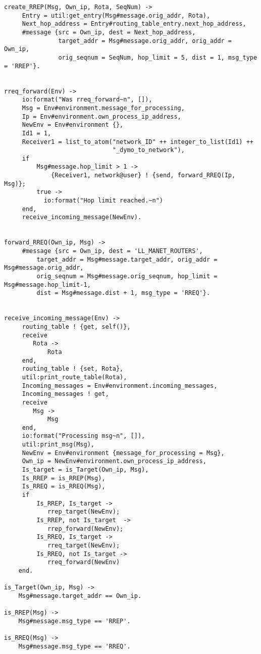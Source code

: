 \begin{verbatim}
create_RREP(Msg, Own_ip, Rota, SeqNum) ->
     Entry = util:get_entry(Msg#message.orig_addr, Rota),
     Next_hop_address = Entry#routing_table_entry.next_hop_address,
     #message {src = Own_ip, dest = Next_hop_address, 
               target_addr = Msg#message.orig_addr, orig_addr = Own_ip, 
               orig_seqnum = SeqNum, hop_limit = 5, dist = 1, msg_type = 'RREP'}.


rreq_forward(Env) -> 
     io:format("Was rreq_forward~n", []), 
     Msg = Env#environment.message_for_processing,
     Ip = Env#environment.own_process_ip_address,
     NewEnv = Env#environment {},
     Id1 = 1,
     Receiver1 = list_to_atom("network_ID" ++ integer_to_list(Id1) ++ 
                              "_dymo_to_network"),
     if
         Msg#message.hop_limit > 1 ->
             {Receiver1, network@user} ! {send, forward_RREQ(Ip, Msg)};
         true ->
           io:format("Hop limit reached.~n")
     end,
     receive_incoming_message(NewEnv).


forward_RREQ(Own_ip, Msg) ->
     #message {src = Own_ip, dest = 'LL_MANET_ROUTERS', 
         target_addr = Msg#message.target_addr, orig_addr = Msg#message.orig_addr, 
         orig_seqnum = Msg#message.orig_seqnum, hop_limit = Msg#message.hop_limit-1, 
         dist = Msg#message.dist + 1, msg_type = 'RREQ'}.


receive_incoming_message(Env) -> 
     routing_table ! {get, self()},
     receive 
        Rota -> 
            Rota
     end,
     routing_table ! {set, Rota},
     util:print_route_table(Rota),     
     Incoming_messages = Env#environment.incoming_messages,
     Incoming_messages ! get,
     receive 
        Msg -> 
            Msg
     end,    
     io:format("Processing msg~n", []),
     util:print_msg(Msg),    
     NewEnv = Env#environment {message_for_processing = Msg},
     Own_ip = NewEnv#environment.own_process_ip_address,
     Is_target = is_Target(Own_ip, Msg),
     Is_RREP = is_RREP(Msg),
     Is_RREQ = is_RREQ(Msg),
     if
         Is_RREP, Is_target ->
            rrep_target(NewEnv);
         Is_RREP, not Is_target  ->
            rrep_forward(NewEnv);
         Is_RREQ, Is_target ->
            rreq_target(NewEnv);
         Is_RREQ, not Is_target ->
            rreq_forward(NewEnv)
    end.

is_Target(Own_ip, Msg) ->
    Msg#message.target_addr == Own_ip.

is_RREP(Msg) ->
    Msg#message.msg_type == 'RREP'.

is_RREQ(Msg) ->
    Msg#message.msg_type == 'RREQ'.
\end{verbatim}
\normalsize